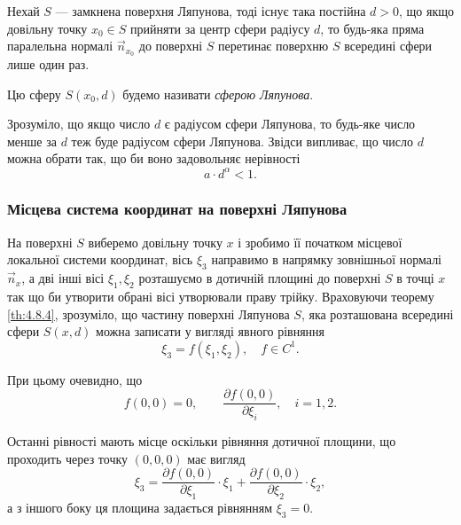 \begin{theorem}
	\label{th:4.8.4}
	Нехай $S$ --- замкнена поверхня Ляпунова, тоді існує така постійна $d > 0$, що якщо довільну точку $x_0 \in S$ прийняти за центр сфери радіусу $d$, то будь-яка пряма паралельна нормалі $\vec n_{x_0}$ до поверхні $S$  перетинає поверхню $S$ всередині сфери лише один раз. 
\end{theorem}

\begin{definition}
	Цю сферу $S(x_0, d)$ будемо називати \textit{сферою Ляпунова}.
\end{definition}

\begin{remark}
	Зрозуміло, що якщо число $d$ є радіусом сфери Ляпунова, то будь-яке число менше за $d$ теж буде радіусом сфери Ляпунова. Звідси випливає, що число $d$ можна обрати так, що би воно задовольняє нерівності
	\begin{equation}
		\label{eq:4.8.10}
		a \cdot d^\alpha < 1.
	\end{equation}
\end{remark}

\subsubsection{Місцева система координат на поверхні Ляпунова}

На поверхні $S$ виберемо довільну точку $x$ і зробимо її початком місцевої локальної системи координат, вісь $\xi_3$ направимо в напрямку зовнішньої нормалі $\vec n_x$, а дві інші вісі $\xi_1, \xi_2$ розташуємо в дотичній площині до поверхні $S$ в точці $x$ так що би утворити обрані вісі утворювали праву трійку. Враховуючи теорему \ref{th:4.8.4}, зрозуміло, що частину поверхні Ляпунова $S$, яка розташована всередині сфери $S(x, d)$ можна записати у вигляді явного рівняння
\begin{equation}
	\label{eq:4.8.11}
	\xi_3 = f(\xi_1, \xi_2), \quad f \in C^1.
\end{equation}

При цьому очевидно, що
\begin{equation}
	\label{eq:4.8.12}
	f(0, 0) = 0, \qquad \frac{\partial f(0, 0)}{\partial \xi_i}, \quad i = 1, 2.
\end{equation}

Останні рівності мають місце оскільки рівняння дотичної площини, що проходить через точку $(0,0,0)$ має вигляд
\begin{equation}
	\xi_3 = \frac{\partial f(0, 0)}{\partial \xi_1} \cdot \xi_1 + \frac{\partial f(0, 0)}{\partial \xi_2} \cdot \xi_2,
\end{equation}
а з іншого боку ця площина задається рівнянням $\xi_3 = 0$.

